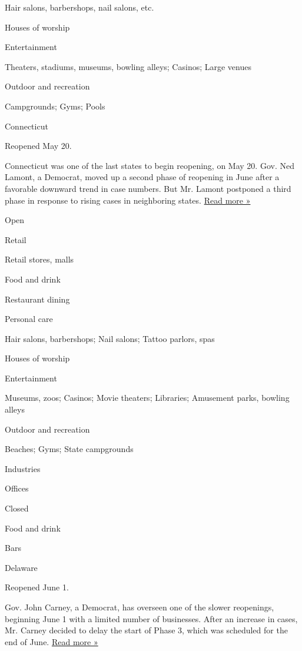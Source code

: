 Hair salons, barbershops, nail salons, etc.

Houses of worship

Entertainment

Theaters, stadiums, museums, bowling alleys; Casinos; Large venues

Outdoor and recreation

Campgrounds; Gyms; Pools

Connecticut

Reopened May 20.

Connecticut was one of the last states to begin reopening, on May 20.
Gov. Ned Lamont, a Democrat, moved up a second phase of reopening in
June after a favorable downward trend in case numbers. But Mr. Lamont
postponed a third phase in response to rising cases in neighboring
states.
\href{https://www.courant.com/coronavirus/hc-news-coronavirus-clb-reopening-paused-20200707-lnivp6hb4redtphmjj7yif3kci-story.html}{Read
more »}

Open

Retail

Retail stores, malls

Food and drink

Restaurant dining

Personal care

Hair salons, barbershops; Nail salons; Tattoo parlors, spas

Houses of worship

Entertainment

Museums, zoos; Casinos; Movie theaters; Libraries; Amusement parks,
bowling alleys

Outdoor and recreation

Beaches; Gyms; State campgrounds

Industries

Offices

Closed

Food and drink

Bars

Delaware

Reopened June 1.

Gov. John Carney, a Democrat, has overseen one of the slower reopenings,
beginning June 1 with a limited number of businesses. After an increase
in cases, Mr. Carney decided to delay the start of Phase 3, which was
scheduled for the end of June.
\href{https://www.delawareonline.com/story/news/coronavirus-in-delaware/2020/06/25/delaware-wont-go-into-phase-3-monday-gov-john-carney-says-coronavirus-delaware-reopen-covid-19/3260541001/}{Read
more »}

